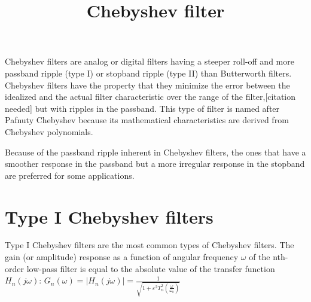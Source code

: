 \documentclass[journal abbreviation, manuscript]{copernicus}
\begin{document}
\title{Chebyshev filter}



\Author[]{}{}










\received{}
\pubdiscuss{} %
\revised{}
\accepted{}
\published{}




\maketitle






\introduction  %
Chebyshev filters are analog or digital filters having a steeper roll-off and more passband ripple (type I) or stopband ripple (type II) than Butterworth filters. Chebyshev filters have the property that they minimize the error between the idealized and the actual filter characteristic over the range of the filter,[citation needed] but with ripples in the passband. This type of filter is named after Pafnuty Chebyshev because its mathematical characteristics are derived from Chebyshev polynomials.

Because of the passband ripple inherent in Chebyshev filters, the ones that have a smoother response in the passband but a more irregular response in the stopband are preferred for some applications.



\section{Type I Chebyshev filters}
Type I Chebyshev filters are the most common types of Chebyshev filters. The gain (or amplitude) response as a function of angular frequency $\omega$ of the nth-order low-pass filter is equal to the absolute value of the transfer function $H_n(j\omega)$:
$G_n(\omega)=\left | H_n(j \omega) \right | = \frac{1}{\sqrt{1+\varepsilon^2 T_n^2\left(\frac{\omega}{\omega_0}\right)}}$
\end{document}
